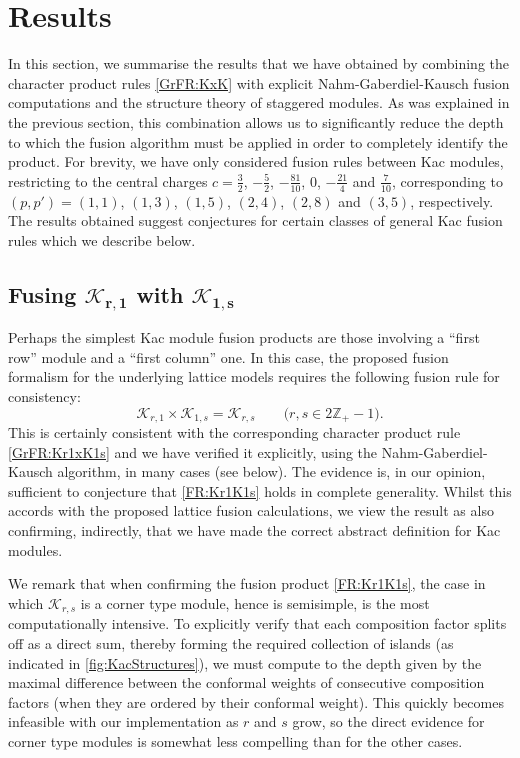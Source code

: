 \documentclass[a4paper,reqno,12pt]{report}
\theoremstyle{definition}
\numberwithin{equation}{section}
\newcommand{\ZZ}{\mathbb{Z}}
\newcommand{\Kac}[1]{\mathcal{K}_{#1}}       %
\newcommand{\fuse}{\mathbin{\times}}                                            %
\newcommand{\NGK}{Nahm-Gaberdiel-Kausch}
\theoremstyle{plain}
\begin{document}
\chapter{Results} \label{ch:Results}

In this section, we summarise the results that we have obtained by combining the character product rules \eqref{GrFR:KxK} with explicit \NGK{} fusion computations and the structure theory of staggered modules.  As was explained in the previous section, this combination allows us to significantly reduce the depth to which the fusion algorithm must be applied in order to completely identify the product.  For brevity, we have only considered fusion rules between Kac modules, restricting to the central charges $c = \frac{3}{2}$, $-\frac{5}{2}$, $-\frac{81}{10}$, $0$, $-\frac{21}{4}$ and $\frac{7}{10}$, corresponding to $(p,p') = (1,1)$, $(1,3)$, $(1,5)$, $(2,4)$, $(2,8)$ and $(3,5)$, respectively.  The results obtained suggest conjectures for certain classes of general Kac fusion rules which we describe below.

\section{Fusing $\bm{\Kac{r,1}}$ with $\bm{\Kac{1,s}}$} \label{sec:Kr1K1s}

Perhaps the simplest Kac module fusion products are those involving a ``first row'' module and a ``first column'' one.  In this case, the proposed fusion formalism for the underlying lattice models \cite{PeaLog14,MorKac15} 
requires the following fusion rule for consistency:
\begin{equation} \label{FR:Kr1K1s}
\Kac{r,1}\fuse \Kac{1,s} = \Kac{r,s} \qquad \text{(\(r,s \in 2 \ZZ_+ - 1\)).}
\end{equation}
This is certainly consistent with the corresponding character product rule \eqref{GrFR:Kr1xK1s} and we have verified it explicitly, using the \NGK{} algorithm, in many cases (see below).  The evidence is, in our opinion, sufficient to conjecture that \eqref{FR:Kr1K1s} holds in complete generality. Whilst this accords with the proposed lattice fusion calculations, we view the result as also confirming, indirectly, that we have made the correct abstract definition for Kac modules.  

We remark that when confirming the fusion product \eqref{FR:Kr1K1s}, the case in which $\Kac{r,s}$ is a corner type module, hence is semisimple, is the most computationally intensive.  To explicitly verify that each composition factor splits off as a direct sum, thereby forming the required collection of islands (as indicated in \cref{fig:KacStructures}), we must compute to the depth given by the maximal difference between the conformal weights of consecutive composition factors (when they are ordered by their conformal weight).  This quickly becomes infeasible with our implementation as $r$ and $s$ grow, so the direct evidence for corner type modules is somewhat less compelling than for the other cases.
\end{document}
